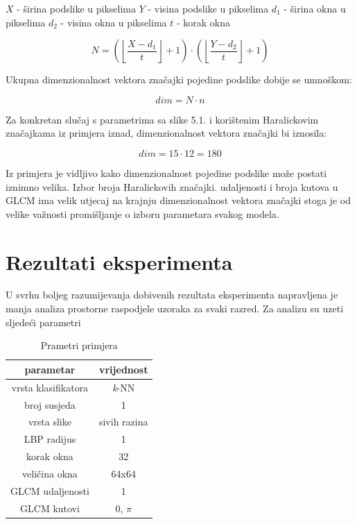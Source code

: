 \documentclass[times, utf8, zavrsni]{fer}
\begin{document}
\begin{center}

\(X\) - širina podslike u pikselima
\(Y\) - visina podslike u pikselima
\(d_1\) - širina okna u pikselima
\(d_2\) - visina okna u pikselima
\(t\) - korak okna

\[
N = \left(\left\lfloor\frac{X-d_1}{t}\right\rfloor + 1\right) \cdot
\left(\left\lfloor\frac{Y-d_2}{t}\right\rfloor + 1\right)
\]

Ukupna dimenzionalnost vektora značajki pojedine podslike dobije se umnoškom:

\[
dim = N \cdot n
\]

Za konkretan slučaj s parametrima sa slike 5.1. i korištenim Haralickovim 
značajkama iz primjera iznad, dimenzionalnost vektora značajki bi iznosila:

\[
dim = 15 \cdot 12 = 180
\]

\end{center}

Iz primjera je vidljivo kako dimenzionalnost pojedine podslike može postati
iznimno velika. Izbor broja Haralickovih značajki. udaljenosti i broja kutova u 
GLCM ima velik utjecaj na krajnju dimenzionalnost vektora značajki stoga je
od velike važnosti promišljanje o izboru parametara svakog modela. 


\chapter{Rezultati eksperimenta}

U svrhu boljeg razumijevanja dobivenih rezultata eksperimenta napravljena je manja  analiza
prostorne raspodjele uzoraka za svaki razred. Za analizu su uzeti sljedeći parametri

\begin{table}[ht]
\centering
\begin{tabular}{c|c}
parametar & vrijednost \\
\hline
vrsta klasifikatora & \textit{k}-NN \\
broj susjeda & 1 \\
vrsta slike & sivih razina \\
LBP radijus & 1 \\
korak okna & 32 \\
veličina okna & 64x64 \\
GLCM udaljenosti & 1 \\
GLCM kutovi & 0, \(\pi\) \\
\end{tabular}
\caption{Prametri primjera} 
\end{table}
\end{document}

